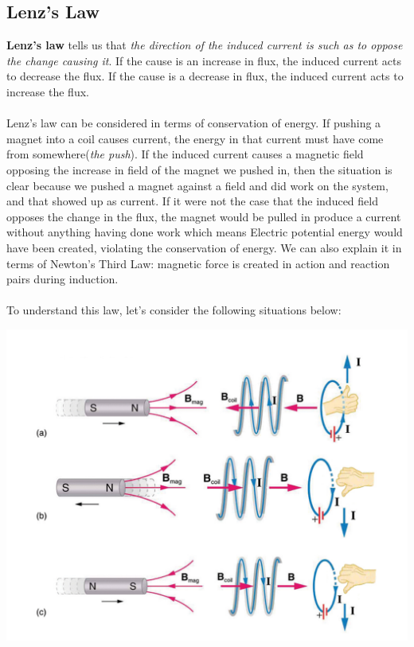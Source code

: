 \documentclass[9pt]{article}
\begin{document}
	\subsection*{Lenz's Law}
	\textbf{Lenz's law} tells us that \textit{the direction of the induced current is such as to oppose the change causing it}. If the cause is an increase in flux, the induced current acts to decrease the flux. If the cause is a decrease in flux, the induced current acts to increase the flux. \\ \\
	Lenz’s law can be considered in terms of conservation of energy. If pushing a magnet into a coil causes current, the energy in that current must have come from somewhere(\textit{the push}). If the induced current causes a magnetic field opposing the increase in field of the magnet we pushed in, then the situation is clear because we pushed a magnet against a field and did work on the system, and that showed up as current. If it were not the case that the induced field opposes the change in the flux, the magnet would be pulled in produce a current without anything having done work which means Electric potential energy would have been created, violating the conservation of energy.  We can also explain it in terms of Newton's Third Law: magnetic force is created in action and reaction pairs during induction.\\ \\
	To understand this law, let's consider the following situations below:
	\begin{center}
		\includegraphics[scale=0.25]{lenzs_law}
	\end{center}
\end{document}
